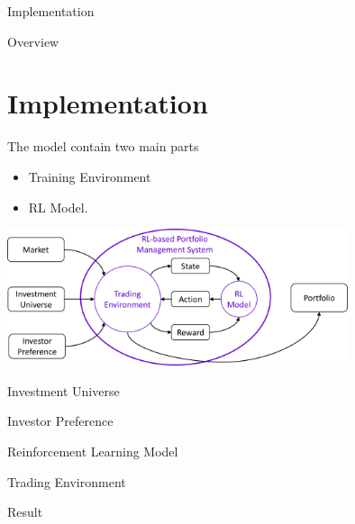 \begin{frame}{Implementation}
\end{frame}

\begin{frame}{Overview}
\section{Implementation}
The model contain two main parts
\begin{itemize}
    \item Training Environment
    \item RL Model. 
\end{itemize}

\includegraphics[width=10cm]{images/context_diagram.png}
\end{frame}
\begin{frame}{Investment Universe}
\end{frame}
\begin{frame}{Investor Preference}
\end{frame}
\begin{frame}{Reinforcement Learning Model}
\end{frame}
\begin{frame}{Trading Environment}
\end{frame}
\begin{frame}{Result}
\end{frame}

